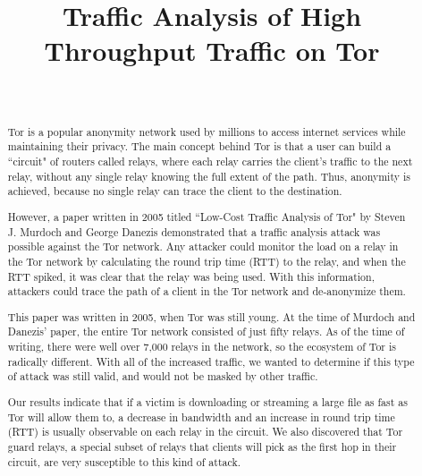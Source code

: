 \documentclass[12pt,journal]{IEEEtran}
\begin{document}
\title{Traffic Analysis of High Throughput Traffic on Tor}
\author{\\
        }
\maketitle

\begin{abstract}
Tor is a popular anonymity network used by millions to access internet services while maintaining their privacy. The main concept behind Tor is that a user can build a ``circuit" of routers called relays, where each relay carries the client's traffic to the next relay, without any single relay knowing the full extent of the path. Thus, anonymity is achieved, because no single relay can trace the client to the destination.

However, a paper written in 2005 titled ``Low-Cost Traffic Analysis of Tor" by Steven J. Murdoch and George Danezis demonstrated that a traffic analysis attack was possible against the Tor network. Any attacker could monitor the load on a relay in the Tor network by calculating the round trip time (RTT) to the relay, and when the RTT spiked, it was clear that the relay was being used. With this information, attackers could trace the path of a client in the Tor network and de-anonymize them.

This paper was written in 2005, when Tor was still young. At the time of Murdoch and Danezis' paper, the entire Tor network consisted of just fifty relays. As of the time of writing, there were well over 7,000 relays in the network, so the ecosystem of Tor is radically different. With all of the increased traffic, we wanted to determine if this type of attack was still valid, and would not be masked by other traffic.

Our results indicate that if a victim is downloading or streaming a large file as fast as Tor will allow them to, a decrease in bandwidth and an increase in round trip time (RTT) is usually observable on each relay in the circuit. We also discovered that Tor guard relays, a special subset of relays that clients will pick as the first hop in their circuit, are very susceptible to this kind of attack.

\end{abstract}
\end{document}
